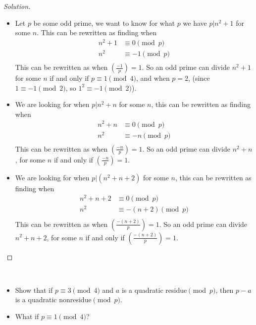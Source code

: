 \documentclass[11pt]{article}
\newcommand\leg[2]{\left(\frac{#1}{#2}\right)}
\newenvironment{problem}[2][Problem]{\begin{trivlist}
\item[\hskip \labelsep {\bfseries #1}\hskip \labelsep {\bfseries #2.}]}{\end{trivlist}}
\newenvironment{solution}
  {\renewcommand\qedsymbol{$~$}\begin{proof}[Solution]$ $\par\nobreak\ignorespaces}
  {\end{proof}}
\begin{document}
\begin{solution}
  \begin{itemize}
    \item [(a)] Let $p$ be some odd prime, we want to know for what $p$ we have $p|n^2+1$ for some $n$. This can be rewritten as finding when
          \begin{align*}
            n^2+1 & \equiv 0 \pmod{p}  \\
            n^2   & \equiv -1 \pmod{p} \\
          \end{align*}
          This can be rewritten as when $\leg{-1}{p}=1$. So an odd prime can divide $n^2+1$ for some $n$ if and only if $p\equiv 1 \pmod{4}$, and when $p=2$, (since $1\equiv -1 \pmod{2}$, so $1^2\equiv -1\pmod{2}$).
    \item [(b)] We are looking for when $p|n^2+n$ for some $n$, this can be rewritten as finding when
          \begin{align*}
            n^2+n & \equiv 0 \pmod{p}  \\
            n^2   & \equiv -n \pmod{p} \\
          \end{align*}
          This can be rewritten as when $\leg{-n}{p}=1$. So an odd prime can divide $n^2+n$, for some $n$ if and only if $\leg{-n}{p}=1$.
    \item [(c)] We are looking for when $p|(n^2+n+2)$ for some $n$, this can be rewritten as finding when
          \begin{align*}
            n^2+n +2 & \equiv 0 \pmod{p}      \\
            n^2      & \equiv -(n+2) \pmod{p} \\
          \end{align*}
          This can be rewritten as when $\leg{-(n+2)}{p}=1$. So an odd prime can divide $n^2+n+2$, for some $n$ if and only if $\leg{-(n+2)}{p}=1$.
  \end{itemize}
\end{solution}

\begin{problem}{7} ~\\
\begin{itemize}
  \item [(a)] Show that if $p\equiv 3 \pmod{4}$ and $a$ is a quadratic residue$\pmod{p}$, then $p-a$ is a quadratic nonresidue$\pmod{p}$.
  \item [(b)] What if $p\equiv 1 \pmod{4}$?
\end{itemize}
\end{problem}
\end{document}
